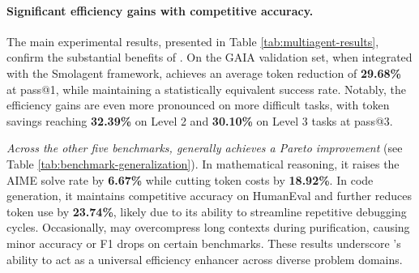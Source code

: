 \paragraph{Significant efficiency gains with competitive accuracy.}
The main experimental results, presented in Table \ref{tab:multiagent-results}, confirm the substantial benefits of \method.
On the GAIA validation set, when integrated with the Smolagent framework, \method achieves an average token reduction of \textbf{29.68\%} at pass@1, while maintaining a statistically equivalent success rate.
Notably, the efficiency gains are even more pronounced on more difficult tasks, with token savings reaching \textbf{32.39\%} on Level 2 and \textbf{30.10\%} on Level 3 tasks at pass@3.

\emph{Across the other five benchmarks, \method generally achieves a Pareto improvement} (see Table \ref{tab:benchmark-generalization}).
In mathematical reasoning, it raises the AIME solve rate by \textbf{6.67\%} while cutting token costs by \textbf{18.92\%}.
In code generation, it maintains competitive accuracy on HumanEval and further reduces token use by \textbf{23.74\%}, likely due to its ability to streamline repetitive debugging cycles.
Occasionally, \method may overcompress long contexts during purification, causing minor accuracy or F1 drops on certain benchmarks.
These results underscore \method's ability to act as a universal efficiency enhancer across diverse problem domains.


